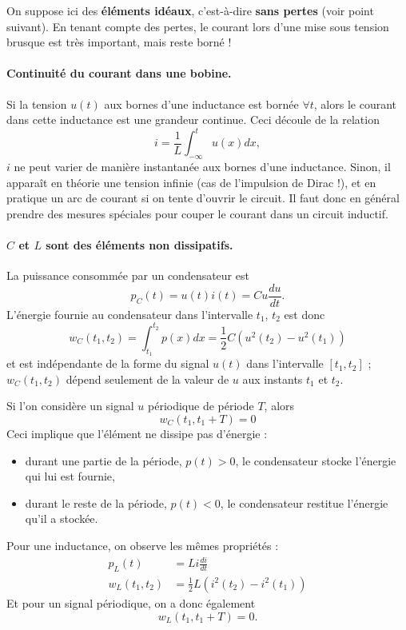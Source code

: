 	On suppose ici des \textbf{éléments idéaux}, c'est-à-dire \textbf{sans pertes} (voir point suivant). En tenant compte des pertes, le courant lors d'une mise sous tension brusque est très important, mais reste borné !
	
\paragraph{Continuité du courant dans une bobine.}
	Si la tension $u(t)$ aux bornes d'une inductance est bornée $\forall t$, 
	alors le courant dans cette inductance est une grandeur continue.
	Ceci découle de la relation \[i=\frac{1}{L}\int_{-\infty}^tu(x)dx,\]
	$i$ ne peut varier de manière instantanée aux bornes d'une inductance.
	Sinon, il apparaît en théorie une tension infinie (cas de l'impulsion de Dirac !), et en pratique un arc de courant si on tente d'ouvrir le circuit.
	Il faut donc en général prendre des mesures spéciales pour couper le courant dans un circuit inductif.

\paragraph{$C$ et $L$ sont des éléments non dissipatifs.}
	La puissance consommée par un condensateur est $$ 
	p_C(t)=u(t)i(t)=Cu\frac{du}{dt}.$$
	L'énergie fournie au condensateur dans l'intervalle $t_1$, $t_2$ est donc
	\[w_C(t_1,t_2)=\int_{t_1}^{t_2}p(x)dx=\frac{1}{2}C(u^2(t_2)-u^2(t_1))\]
	et est indépendante de la forme du signal $u(t)$ dans l'intervalle
	$[t_1,t_2]$ ; 
	$w_C(t_1,t_2)$ dépend seulement de la valeur de $u$ aux instants $t_1$ et $t_2$.
	
	Si l'on considère un signal $u$ périodique de période $T$, alors
	\[w_C(t_1,t_1+T) = 0\]
	Ceci implique que l'élément ne dissipe pas d'énergie : 
	\begin{itemize}
		\item durant une partie de la période, $p(t)>0$, le condensateur
		stocke l'énergie qui lui est fournie,
		\item durant le reste de la période, $p(t)<0$, le condensateur
		restitue l'énergie qu'il a stockée.
	\end{itemize}
	Pour une inductance, on observe les mêmes propriétés :
	\begin{align*}
	p_L(t)&=Li\frac{di}{dt}\\
	w_L(t_1,t_2)& =\frac{1}{2}L(i^2(t_2)-i^2(t_1))
	\end{align*}
	Et pour un signal périodique, on a donc également
	\[w_L(t_1,t_1+T) = 0.\]
	
